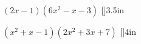 

    {
        $ (2x-1) (6x^2 - x - 3) $
    }
    [\large]{3.5in}



    \myWideProblem
    {
        $ (x^2 + x -1) (2x^2 + 3x+ 7) $
    }
    [\large]{4in}
